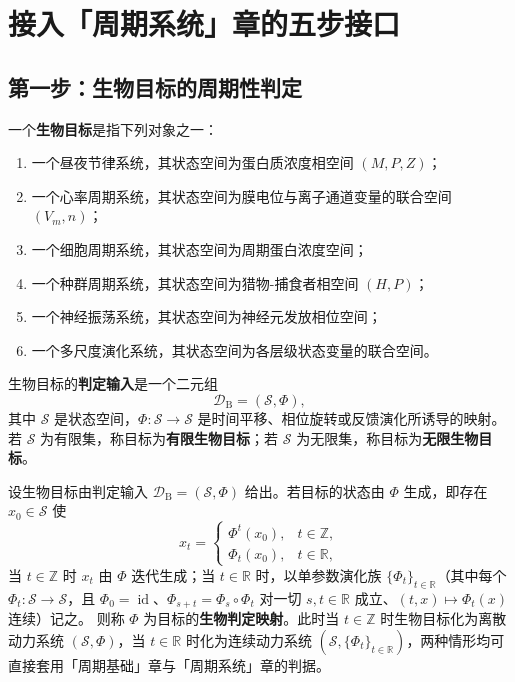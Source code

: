\section{接入「周期系统」章的五步接口}
\label{sec:bio_five_steps}

\subsection{第一步：生物目标的周期性判定}

\begin{definition}[生物目标与判定输入]\label{def:bio_target}
一个\textbf{生物目标}是指下列对象之一：
\begin{enumerate}[label=(\roman*)]
    \item 一个昼夜节律系统，其状态空间为蛋白质浓度相空间 $(M,P,Z)$；
    \item 一个心率周期系统，其状态空间为膜电位与离子通道变量的联合空间 $(V_m,n)$；
    \item 一个细胞周期系统，其状态空间为周期蛋白浓度空间；
    \item 一个种群周期系统，其状态空间为猎物-捕食者相空间 $(H,P)$；
    \item 一个神经振荡系统，其状态空间为神经元发放相位空间；
    \item 一个多尺度演化系统，其状态空间为各层级状态变量的联合空间。
\end{enumerate}
生物目标的\textbf{判定输入}是一个二元组
\[
\mathcal D_{\mathrm{B}}=(\mathcal S,\Phi),
\]
其中 $\mathcal S$ 是状态空间，$\Phi:\mathcal S\to\mathcal S$ 是时间平移、相位旋转或反馈演化所诱导的映射。若 $\mathcal S$ 为有限集，称目标为\textbf{有限生物目标}；若 $\mathcal S$ 为无限集，称目标为\textbf{无限生物目标}。
\end{definition}

\begin{definition}[生物判定映射]\label{def:bio_periodization}
设生物目标由判定输入 $\mathcal D_{\mathrm{B}}=(\mathcal S,\Phi)$ 给出。若目标的状态由 $\Phi$ 生成，即存在 $x_0\in\mathcal S$ 使
\[
x_t=\begin{cases}\Phi^t(x_0), & t\in\mathbb Z,\\ \Phi_t(x_0), & t\in\mathbb R,\end{cases}
\]
当 $t\in\mathbb Z$ 时 $x_t$ 由 $\Phi$ 迭代生成；当 $t\in\mathbb R$ 时，以单参数演化族 $\{\Phi_t\}_{t\in\mathbb R}$（其中每个 $\Phi_t:\mathcal S\to\mathcal S$，且 $\Phi_0=\operatorname{id}$、$\Phi_{s+t}=\Phi_s\circ\Phi_t$ 对一切 $s,t\in\mathbb R$ 成立、$(t,x)\mapsto\Phi_t(x)$ 连续）记之。
则称 $\Phi$ 为目标的\textbf{生物判定映射}。此时当 $t\in\mathbb Z$ 时生物目标化为离散动力系统 $(\mathcal S,\Phi)$，当 $t\in\mathbb R$ 时化为连续动力系统 $(\mathcal S,\{\Phi_t\}_{t\in\mathbb R})$，两种情形均可直接套用「周期基础」章与「周期系统」章的判据。
\end{definition}

